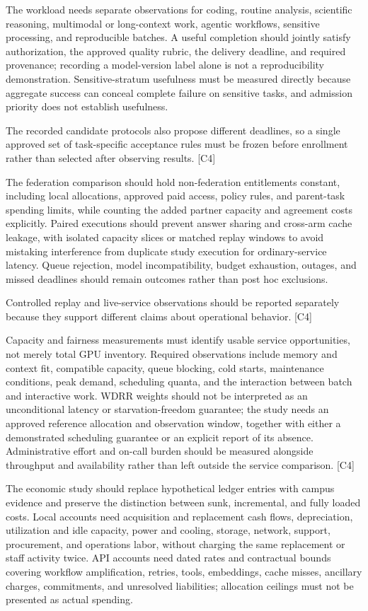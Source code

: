 \documentclass[11pt]{article}
\begin{document}
The workload needs separate observations for coding, routine analysis, scientific reasoning, multimodal or long-context work, agentic workflows, sensitive processing, and reproducible batches. A useful completion should jointly satisfy authorization, the approved quality rubric, the delivery deadline, and required provenance; recording a model-version label alone is not a reproducibility demonstration. Sensitive-stratum usefulness must be measured directly because aggregate success can conceal complete failure on sensitive tasks, and admission priority does not establish usefulness.

The recorded candidate protocols also propose different deadlines, so a single approved set of task-specific acceptance rules must be frozen before enrollment rather than selected after observing results. [C4]

The federation comparison should hold non-federation entitlements constant, including local allocations, approved paid access, policy rules, and parent-task spending limits, while counting the added partner capacity and agreement costs explicitly. Paired executions should prevent answer sharing and cross-arm cache leakage, with isolated capacity slices or matched replay windows to avoid mistaking interference from duplicate study execution for ordinary-service latency. Queue rejection, model incompatibility, budget exhaustion, outages, and missed deadlines should remain outcomes rather than post hoc exclusions.

Controlled replay and live-service observations should be reported separately because they support different claims about operational behavior. [C4]

Capacity and fairness measurements must identify usable service opportunities, not merely total GPU inventory. Required observations include memory and context fit, compatible capacity, queue blocking, cold starts, maintenance conditions, peak demand, scheduling quanta, and the interaction between batch and interactive work. WDRR weights should not be interpreted as an unconditional latency or starvation-freedom guarantee; the study needs an approved reference allocation and observation window, together with either a demonstrated scheduling guarantee or an explicit report of its absence. Administrative effort and on-call burden should be measured alongside throughput and availability rather than left outside the service comparison. [C4]

The economic study should replace hypothetical ledger entries with campus evidence and preserve the distinction between sunk, incremental, and fully loaded costs. Local accounts need acquisition and replacement cash flows, depreciation, utilization and idle capacity, power and cooling, storage, network, support, procurement, and operations labor, without charging the same replacement or staff activity twice. API accounts need dated rates and contractual bounds covering workflow amplification, retries, tools, embeddings, cache misses, ancillary charges, commitments, and unresolved liabilities; allocation ceilings must not be presented as actual spending.
\end{document}

